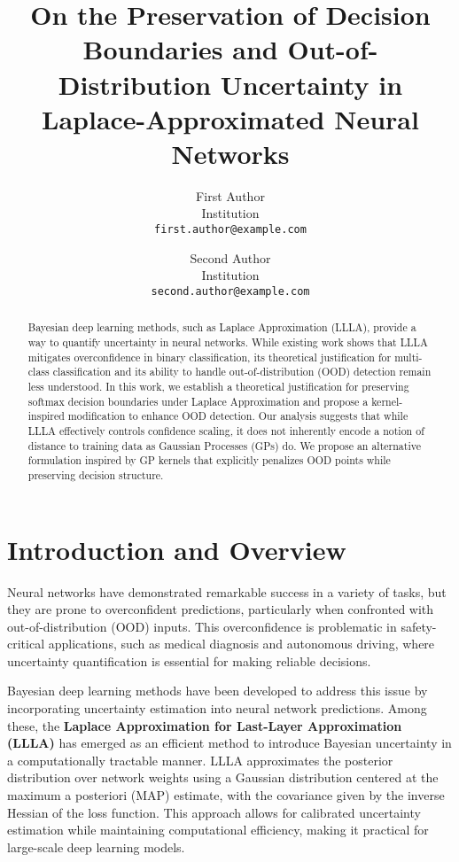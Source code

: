 \documentclass{article}
\title{On the Preservation of Decision Boundaries and Out-of-Distribution Uncertainty in Laplace-Approximated Neural Networks}
\author{%
  First Author \\
  Institution \\
  \texttt{first.author@example.com}
  \and
  Second Author \\
  Institution \\
  \texttt{second.author@example.com}
}
\begin{document}
\maketitle

\begin{abstract}
Bayesian deep learning methods, such as Laplace Approximation (LLLA), provide a way to quantify uncertainty in neural networks. While existing work shows that LLLA mitigates overconfidence in binary classification, its theoretical justification for multi-class classification and its ability to handle out-of-distribution (OOD) detection remain less understood. In this work, we establish a theoretical justification for preserving softmax decision boundaries under Laplace Approximation and propose a kernel-inspired modification to enhance OOD detection. Our analysis suggests that while LLLA effectively controls confidence scaling, it does not inherently encode a notion of distance to training data as Gaussian Processes (GPs) do. We propose an alternative formulation inspired by GP kernels that explicitly penalizes OOD points while preserving decision structure. 
\end{abstract}

\section{Introduction and Overview}

Neural networks have demonstrated remarkable success in a variety of tasks, but they are prone to overconfident predictions, particularly when confronted with out-of-distribution (OOD) inputs. This overconfidence is problematic in safety-critical applications, such as medical diagnosis and autonomous driving, where uncertainty quantification is essential for making reliable decisions.

Bayesian deep learning methods have been developed to address this issue by incorporating uncertainty estimation into neural network predictions. Among these, the \textbf{Laplace Approximation for Last-Layer Approximation (LLLA)} \citep{ritter2018scalable, immer2021improving} has emerged as an efficient method to introduce Bayesian uncertainty in a computationally tractable manner. LLLA approximates the posterior distribution over network weights using a Gaussian distribution centered at the maximum a posteriori (MAP) estimate, with the covariance given by the inverse Hessian of the loss function. This approach allows for calibrated uncertainty estimation while maintaining computational efficiency, making it practical for large-scale deep learning models.
\end{document}
